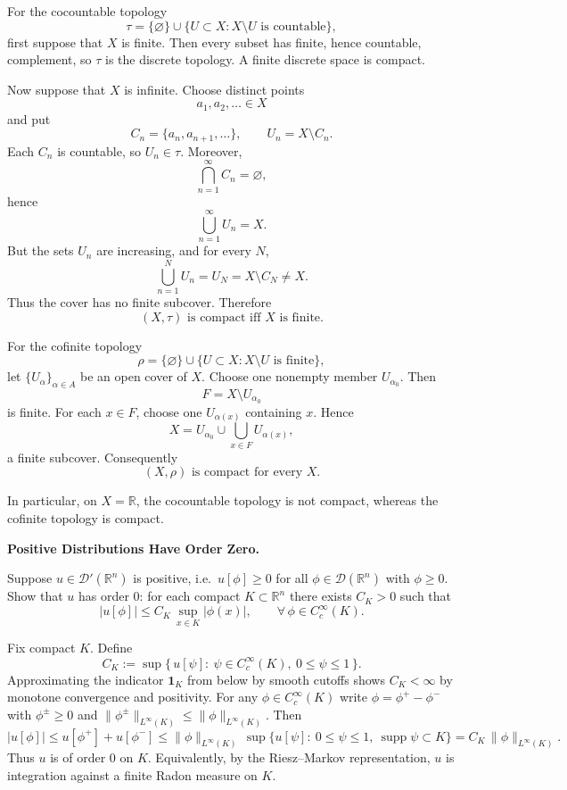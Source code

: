 \begin{solution}
For the cocountable topology
\[
\tau=\{\varnothing\}\cup\{U\subset X:X\setminus U\text{ is countable}\},
\]
first suppose that \(X\) is finite. Then every subset has finite, hence countable, complement, so \(\tau\) is the discrete topology. A finite discrete space is compact.

Now suppose that \(X\) is infinite. Choose distinct points
\[
a_1,a_2,\ldots\in X
\]
and put
\[
C_n=\{a_n,a_{n+1},\ldots\},
\qquad
U_n=X\setminus C_n.
\]
Each \(C_n\) is countable, so \(U_n\in\tau\). Moreover,
\[
\bigcap_{n=1}^\infty C_n=\varnothing,
\]
hence
\[
\bigcup_{n=1}^\infty U_n=X.
\]
But the sets \(U_n\) are increasing, and for every \(N\),
\[
\bigcup_{n=1}^{N}U_n
=
U_N
=
X\setminus C_N
\neq X.
\]
Thus the cover has no finite subcover. Therefore
\[
\boxed{(X,\tau)\text{ is compact iff }X\text{ is finite}.}
\]

For the cofinite topology
\[
\rho=\{\varnothing\}\cup\{U\subset X:X\setminus U\text{ is finite}\},
\]
let \(\{U_\alpha\}_{\alpha\in A}\) be an open cover of \(X\). Choose one nonempty member \(U_{\alpha_0}\). Then
\[
F=X\setminus U_{\alpha_0}
\]
is finite. For each \(x\in F\), choose one \(U_{\alpha(x)}\) containing \(x\). Hence
\[
X
=
U_{\alpha_0}\cup
\bigcup_{x\in F}U_{\alpha(x)},
\]
a finite subcover. Consequently
\[
\boxed{(X,\rho)\text{ is compact for every }X.}
\]

In particular, on \(X=\mathbb R\), the cocountable topology is not compact, whereas the cofinite topology is compact.
\end{solution}


\begin{problem}[CP-II-0137]
\label{prob:cp-ii-0137}
\textbf{Positive Distributions Have Order Zero.}

\hspace*{1.5em}Suppose $u\in\mathcal D'(\mathbb R^n)$ is positive, i.e.\ $u[\phi]\ge 0$ for all $\phi\in\mathcal D(\mathbb R^n)$ with $\phi\ge 0$.
Show that $u$ has order $0$: for each compact $K\subset\mathbb R^n$ there exists $C_K>0$ such that
\[
|u[\phi]|\le C_K\,\sup_{x\in K}|\phi(x)|,\qquad \forall\,\phi\in C_c^\infty(K).
\]

Fix compact $K$. Define
\[
C_K:=\sup\{\,u[\psi]:\ \psi\in C_c^\infty(K),\ 0\le \psi\le 1\,\}.
\]
Approximating the indicator $\mathbf 1_K$ from below by smooth cutoffs shows $C_K<\infty$ by monotone convergence and positivity.
For any $\phi\in C_c^\infty(K)$ write $\phi=\phi^+-\phi^-$ with $\phi^\pm\ge 0$ and
$\|\phi^\pm\|_{L^\infty(K)}\le \|\phi\|_{L^\infty(K)}$. Then
\[
|u[\phi]|\le u[\phi^+]+u[\phi^-]
\le \|\phi\|_{L^\infty(K)}\,
\sup\{u[\psi]:\ 0\le\psi\le 1,\ \operatorname{supp}\psi\subset K\}
= C_K\,\|\phi\|_{L^\infty(K)}.
\]
Thus $u$ is of order $0$ on $K$. Equivalently, by the Riesz--Markov representation, $u$ is integration against a finite Radon measure on $K$.

\bigskip
\bigskip
\end{problem}

